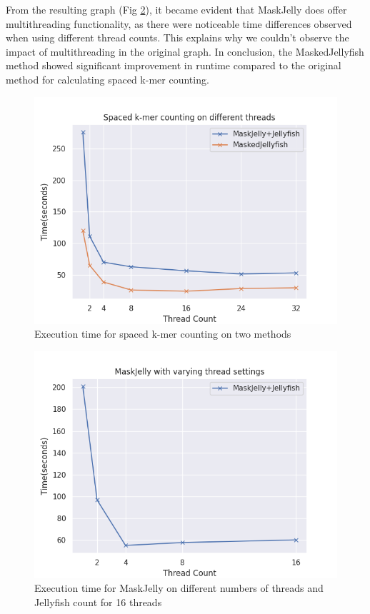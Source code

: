 \documentclass{PHlab-thesis}
\begin{document}
From the resulting graph (Fig \ref{fig:MaskJelly_thread}), it became evident that MaskJelly does offer multithreading functionality, as there were noticeable time differences observed when using different thread counts. This explains why we couldn't observe the impact of multithreading in the original graph. In conclusion, the MaskedJellyfish method showed significant improvement in runtime compared to the original method for calculating spaced k-mer counting.
\begin{figure}
	\centering
	\includegraphics[scale=0.7]{figures/M_compare.png}
	\caption{Execution time for spaced k-mer counting on two methods}
	\label{fig:thread_compare} %
\end{figure}
\begin{figure}
	\centering
	\includegraphics[scale=0.7]{figures/MaskJelly_thread.png}
	\caption{Execution time for MaskJelly on different numbers of threads and Jellyfish count for 16 threads}
	\label{fig:MaskJelly_thread} %
\end{figure}
\end{document}
